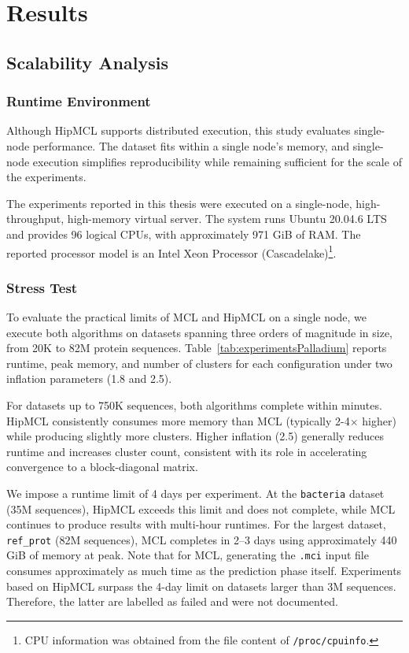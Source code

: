 \section{Results}

\subsection{Scalability Analysis}

\subsubsection*{Runtime Environment}

Although HipMCL supports distributed execution, this study evaluates
single-node performance. The dataset fits within a single node's memory, and
single-node execution simplifies reproducibility while remaining sufficient for
the scale of the experiments.

The experiments reported in this thesis were executed on a single-node,
high-throughput, high-memory virtual server. The system runs Ubuntu 20.04.6
LTS and provides 96 logical CPUs, with approximately 971 GiB of RAM. The
reported processor model is an Intel Xeon Processor (Cascadelake)\footnote{CPU
information was obtained from the file content of \texttt{/proc/cpuinfo}.}.

\subsubsection*{Stress Test}

To evaluate the practical limits of MCL and HipMCL on a single node, we execute
both algorithms on datasets spanning three orders of magnitude in size, from
20K to 82M protein sequences. Table~\ref{tab:experimentsPalladium} reports
runtime, peak memory, and number of clusters for each configuration under two
inflation parameters (1.8 and 2.5).

For datasets up to 750K sequences, both algorithms complete within minutes.
HipMCL consistently consumes more memory than MCL (typically 2-4\(\times\)
higher) while producing slightly more clusters. Higher inflation (2.5)
generally reduces runtime and increases cluster count, consistent with its role
in accelerating convergence to a block-diagonal matrix.

We impose a runtime limit of 4 days per experiment. At the \texttt{bacteria}
dataset (35M sequences), HipMCL exceeds this limit and does not complete, while
MCL continues to produce results with multi-hour runtimes. For the largest
dataset, \texttt{ref\_prot} (82M sequences), MCL completes in 2–3 days using
approximately 440 GiB of memory at peak. Note that for MCL, generating the
\texttt{.mci} input file consumes approximately as much time as the prediction
phase itself. Experiments based on HipMCL surpass the 4-day limit on datasets
larger than 3M sequences. Therefore, the latter are labelled as failed and were
not documented.

